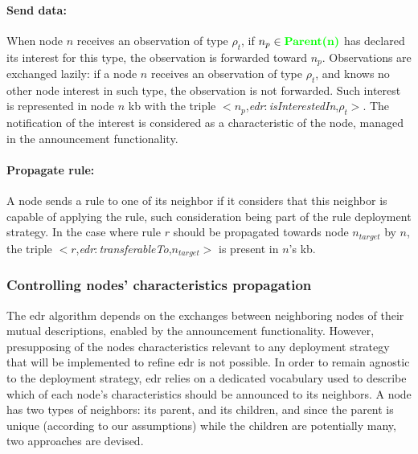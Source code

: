 \documentclass{iosart2c}
\newcommand{\added}[1]{\textcolor{green}{\textbf{#1}}}
\newcommand{\namespace}[1]{\textit{#1$:$}}
\newcommand{\concept}[2]{\namespace{#1}\-\textit{#2}}
\newcommand{\triplet}[3]{$<$#1,\textit{#2},#3$>$}
\begin{document}
\paragraph{Send data:}
\label{par:data_transfer}
When node $n$ receives an observation of type $\rho_t$, if $n_p \in \added{Parent(n)}$ has declared its interest for this type, the observation is forwarded toward $n_{p}$.
Observations are exchanged lazily: if a node $n$ receives an observation of type $\rho_t$, and knows no other node interest in such type, the observation is not forwarded.
Such interest is represented in node $n$ \gls{kb} with the triple \triplet{$n_{p}$}{\concept{edr}{is\-Interested\-In}}{$\rho_t$}.
The notification of the interest is considered as a characteristic of the node, managed in the announcement functionality.

\paragraph{Propagate rule:}
\label{par:send_rule}
A node sends a rule to one of its neighbor if it considers that this neighbor is capable of applying the rule, such consideration being part of the rule deployment strategy. 
In the case where rule $r$ should be propagated towards node $n_{target}$ by $n$, the triple \triplet{$r$}{\concept{edr}{transferable\-To}}{$n_{target}$} is present in $n$'s \gls{kb}.

\subsubsection{Controlling nodes' characteristics propagation}
\label{subsubs:annouce}

The \gls{edr} algorithm depends on the exchanges between neighboring nodes of their mutual descriptions, enabled by the announcement functionality.
However, presupposing of the nodes characteristics relevant to any deployment strategy that will be implemented to refine \gls{edr} is not possible.
In order to remain agnostic to the deployment strategy, \gls{edr} relies on a dedicated vocabulary used to describe which of each node's characteristics should be announced to its neighbors. 
A node has two types of neighbors: its parent, and its children, and since the parent is unique (according to our assumptions) while the children are potentially many, two approaches are devised.
\end{document}
